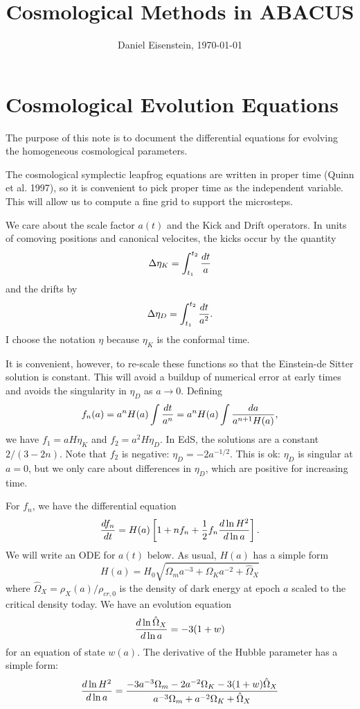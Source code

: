 \documentclass[11pt,preprint]{aastex}
\begin{document}
\title{Cosmological Methods in ABACUS}
\author{Daniel Eisenstein, \today}

\section{Cosmological Evolution Equations}

The purpose of this note is to document the differential equations
for evolving the homogeneous cosmological parameters.

The cosmological symplectic leapfrog equations are written in proper
time (Quinn et al. 1997), so it is convenient to pick proper time as
the independent variable.  This will allow us to compute a fine grid
to support the microsteps.

We care about the scale factor $a(t)$ and the Kick and Drift operators.
In units of comoving positions and canonical velocites, the kicks 
occur by the quantity 
\begin{equation}
\Delta \eta_K = \int_{t_1}^{t_2} {dt\over a}
\end{equation}
and the drifts by
\begin{equation}
\Delta \eta_D = \int_{t_1}^{t_2} {dt\over a^2}.
\end{equation}
I choose the notation $\eta$ because $\eta_K$ is the conformal time.

It is convenient, however, to re-scale these functions so that the
Einstein-de Sitter solution is constant.  This will avoid a buildup
of numerical error at early times and avoids the singularity in
$\eta_D$ as $a\rightarrow0$.  Defining
\begin{equation}
f_n(a) = a^n H(a) \int {dt\over a^n} = a^n H(a) \int {da\over a^{n+1} H(a)},
\end{equation}
we have $f_1 = aH\eta_K$ and $f_2 = a^2 H\eta_D$.  In EdS, the solutions
are a constant $2/(3-2n)$.  Note that $f_2$ is negative: $\eta_D = -2a^{-1/2}$.
This is ok: $\eta_D$ is singular at $a=0$, but we only care about differences
in $\eta_D$, which are positive for increasing time.

For $f_n$, we have the differential equation 
\begin{equation}
{df_n\over dt} = H(a)\left[1+nf_n + {1\over 2}f_n {d\ln H^2\over d\ln a}\right].
\end{equation}
We will write an ODE for $a(t)$ below.  As usual, $H(a)$ has a 
simple form
\begin{equation}
H(a) = H_0 \sqrt{ \Omega_m a^{-3} + \Omega_K a^{-2} + \hat\Omega_X }
\end{equation}
where $\hat\Omega_X = \rho_X(a)/\rho_{cr,0}$ is the density of dark
energy at epoch $a$ scaled to the critical density today.  We have
an evolution equation
\begin{equation}
{d\ln\hat\Omega_X\over d\ln a} = -3(1+w)
\end{equation}
for an equation of state $w(a)$.  
The derivative of the Hubble parameter has a simple form:
\begin{equation}
{d \ln H^2\over d\ln a} = { -3a^{-3}\Omega_m -2 a^{-2} \Omega_K -3(1+w) \hat\Omega_X
\over a^{-3}\Omega_m + a^{-2} \Omega_K + \hat\Omega_X}
\end{equation}
\end{document}
